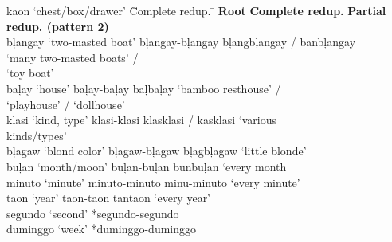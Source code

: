 \begin{tabbing}
kaon ‘chest/box/drawer’ \hspace{.1cm} \= Complete redup. \hspace{.1cm} \= \kill
\textbf{Root}  \>    \textbf{Complete redup.} \> \textbf{Partial redup. (pattern 2)} \\
bļangay ‘two-masted boat’ \>  bļangay-bļangay  \>  bļangbļangay / banbļangay \\
\> \> ‘many two-masted boats’ / \\
\> \> ‘toy boat’ \\
baļay ‘house’ \> baļay-baļay \>  baļbaļay ‘bamboo resthouse’ / \\       \> \> ‘playhouse’ / ‘dollhouse’ \\
klasi ‘kind, type’ \>  klasi-klasi \>       klasklasi / kasklasi ‘various \\
\> \> kinds/types’ \\
bļagaw ‘blond color’ \> bļagaw-bļagaw  \>    bļagbļagaw ‘little blonde’ \\
buļan `month/moon' \> buļan-buļan \> bunbuļan `every month \\
minuto `minute' \> minuto-minuto \> minu-minuto `every minute' \\
taon `year' \> taon-taon \> tantaon `every year' \\
segundo `second' \> *segundo-segundo \\
duminggo `week' \> *duminggo-duminggo
\end{tabbing}
\z
\ea
\label{ex:shell}
